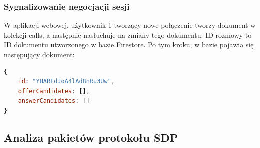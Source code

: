 \subsubsection{Sygnalizowanie negocjacji sesji}

W aplikacji webowej, użytkownik 1 tworzący nowe połączenie tworzy dokument w kolekcji calls, a następnie nasłuchuje na
zmiany tego dokumentu. ID rozmowy to ID dokumentu utworzonego w bazie Firestore. Po tym kroku, w bazie pojawia się
następujący dokument:

\begin{lstlisting}[language=Javascript,label=list:call-doc-1, caption=Dokument połączenia po utworzeniu przez użytkownika 1,
basicstyle=\footnotesize \ttfamily, showtabs=true, tabsize=4]
{
	id: "YHARFdJoA4lAd8nRu3Uw",
	offerCandidates: [],
	answerCandidates: []
}
\end{lstlisting}




\subsection{Analiza pakietów protokołu SDP}
